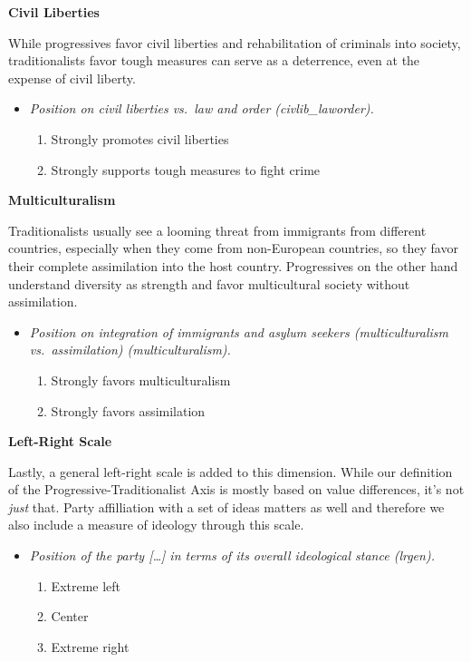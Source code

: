 \documentclass[]{article}
\providecommand{\tightlist}{%
  \setlength{\itemsep}{0pt}\setlength{\parskip}{0pt}}
\begin{document}
\textbf{Civil Liberties}

While progressives favor civil liberties and rehabilitation of criminals
into society, traditionalists favor tough measures can serve as a
deterrence, even at the expense of civil liberty.

\begin{itemize}
\tightlist
\item
  \emph{Position on civil liberties vs.~law and order
  (civlib\_laworder).}

  \begin{enumerate}
  \def\labelenumi{\arabic{enumi}.}
  \setcounter{enumi}{-1}
  \tightlist
  \item
    Strongly promotes civil liberties
  \item
    Strongly supports tough measures to fight crime
  \end{enumerate}
\end{itemize}

\textbf{Multiculturalism}

Traditionalists usually see a looming threat from immigrants from
different countries, especially when they come from non-European
countries, so they favor their complete assimilation into the host
country. Progressives on the other hand understand diversity as strength
and favor multicultural society without assimilation.

\begin{itemize}
\tightlist
\item
  \emph{Position on integration of immigrants and asylum seekers
  (multiculturalism vs.~assimilation) (multiculturalism).}

  \begin{enumerate}
  \def\labelenumi{\arabic{enumi}.}
  \setcounter{enumi}{-1}
  \tightlist
  \item
    Strongly favors multiculturalism
  \item
    Strongly favors assimilation
  \end{enumerate}
\end{itemize}

\textbf{Left-Right Scale}

Lastly, a general left-right scale is added to this dimension. While our
definition of the Progressive-Traditionalist Axis is mostly based on
value differences, it's not \emph{just} that. Party affilliation with a
set of ideas matters as well and therefore we also include a measure of
ideology through this scale.

\begin{itemize}
\tightlist
\item
  \emph{Position of the party {[}\ldots{}{]} in terms of its overall
  ideological stance (lrgen).}

  \begin{enumerate}
  \def\labelenumi{\arabic{enumi}.}
  \setcounter{enumi}{-1}
  \tightlist
  \item
    Extreme left
  \item
    Center
  \item
    Extreme right
  \end{enumerate}
\end{itemize}
\end{document}
